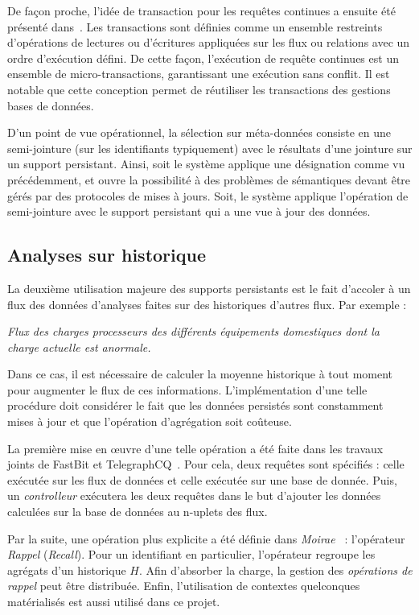 De façon proche, l'idée de transaction pour les requêtes continues a ensuite été présenté dans~\cite{Botan:transaction}. Les transactions sont définies comme un ensemble restreints d'opérations de lectures ou d'écritures appliquées sur les flux ou relations avec un ordre d'exécution défini. De cette façon, l'exécution de requête continues est un ensemble de micro-transactions, garantissant une exécution sans conflit. Il est notable que cette conception permet de réutiliser les transactions des gestions bases de données.

D'un point de vue opérationnel, la sélection sur méta-données consiste en une semi-jointure (sur les identifiants typiquement) avec le résultats d'une jointure sur un support persistant. Ainsi, soit le système applique une désignation comme vu précédemment, et ouvre la possibilité à des problèmes de sémantiques devant être gérés par des protocoles de mises à jours. Soit, le système applique l'opération de semi-jointure avec le support persistant qui a une vue à jour des données.

\subsection{Analyses sur historique}
La deuxième utilisation majeure des supports persistants est le fait d'accoler à un flux des données d'analyses faites sur des historiques d'autres flux. Par exemple :
\begin{center}
\it Flux des charges processeurs des différents équipements domestiques dont la charge actuelle est anormale.
\end{center}
Dans ce cas, il est nécessaire de calculer la moyenne historique à tout moment pour augmenter le flux de ces informations. L'implémentation d'une telle procédure doit considérer le fait que les données persistés sont constamment mises à jour et que l'opération d'agrégation soit coûteuse. 

La première mise en œuvre d'une telle opération a été faite dans les travaux joints de FastBit et TelegraphCQ~\cite{Reiss:fastbit}. Pour cela, deux requêtes sont spécifiés : celle exécutée sur les flux de données et celle exécutée sur une base de donnée. Puis, un \textit{controlleur} exécutera les deux requêtes dans le but d'ajouter les données calculées sur la base de données au n-uplets des flux.

Par la suite, une opération plus explicite a été définie dans \textit{Moirae}~\cite{Balazinska:moirae} : l'opérateur \textit{Rappel} (\textit{Recall}). Pour un identifiant en particulier, l'opérateur regroupe les agrégats d'un historique $H$. Afin d'absorber la charge, la gestion des \textit{opérations de rappel} peut être distribuée. Enfin, l'utilisation de contextes quelconques matérialisés est aussi utilisé dans ce projet.

